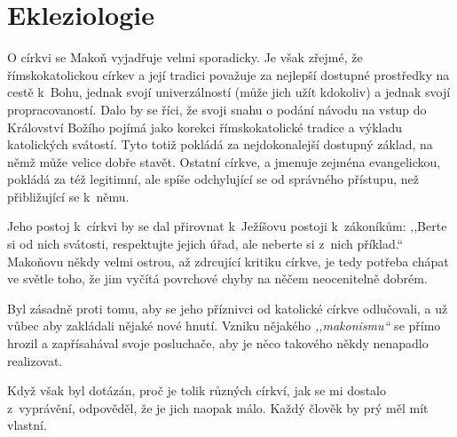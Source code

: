 \section{Ekleziologie}

O církvi se Makoň vyjadřuje velmi sporadicky. Je však zřejmé, že římskokatolickou
církev a její tradici považuje za nejlepší dostupné prostředky na cestě k~Bohu,
jednak svojí univerzálností (může jich užít kdokoliv) a jednak svojí
propracovaností. Dalo by se říci, že svoji snahu o podání návodu na vstup do
Království Božího pojímá jako korekci římskokatolické tradice a výkladu
katolických svátostí. Tyto totiž pokládá za nejdokonalejší dostupný základ, na
němž může velice dobře stavět. Ostatní církve, a jmenuje zejména evangelickou,
pokládá za též legitimní, ale spíše odchylující se od správného přístupu, než
přibližující se k~němu.

Jeho postoj k~církvi by se dal přirovnat k~Ježíšovu postoji k~zákoníkům: ,,Berte
si od nich svátosti, respektujte jejich úřad, ale neberte si z~nich příklad.``
Makoňovu někdy velmi ostrou, až zdrcující kritiku církve, je tedy potřeba chápat
ve světle toho, že jim vyčítá povrchové chyby na něčem neocenitelně dobrém.

Byl zásadně proti tomu, aby se jeho příznivci od katolické církve odlučovali, a
už vůbec aby zakládali nějaké nové hnutí. Vzniku nějakého \textit{,,makonismu``}
se přímo hrozil a zapřísahával svoje posluchače, aby je něco takového někdy
nenapadlo realizovat.

Když však byl dotázán, proč je tolik různých církví, jak se mi dostalo
z~vyprávění, odpověděl, že je jich naopak málo. Každý člověk by prý měl mít
vlastní.

